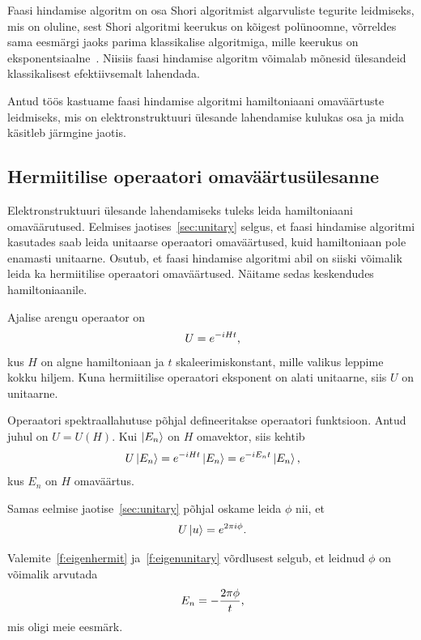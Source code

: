 \documentclass[12pt]{report}
\def\ket#1{\mathinner{|#1\rangle}}
\begin{document}
Faasi hindamise algoritm on osa Shori algoritmist algarvuliste tegurite leidmiseks, mis on oluline, sest Shori algoritmi keerukus on kõigest polünoomne, võrreldes sama eesmärgi jaoks parima klassikalise algoritmiga, mille keerukus on eksponentsiaalne~\cite{cao+etal, kaye+laflamme+mosca}.
Niisiis faasi hindamise algoritm võimalab mõnesid ülesandeid klassikalisest efektiivsemalt lahendada.

Antud töös kastuame faasi hindamise algoritmi hamiltoniaani omaväärtuste leidmiseks, mis on elektronstruktuuri ülesande lahendamise kulukas osa ja mida käsitleb järmgine jaotis.


\subsection{Hermiitilise operaatori omaväärtusülesanne}\label{sec:hermit}

Elektronstruktuuri ülesande lahendamiseks tuleks leida hamiltoniaani omaväärutused.
Eelmises jaotises~\ref{sec:unitary} selgus, et faasi hindamise algoritmi kasutades saab leida unitaarse operaatori omaväärtused, kuid hamiltoniaan pole enamasti unitaarne.
Osutub, et faasi hindamise algoritmi abil on siiski võimalik leida ka hermiitilise operaatori omaväärtused.
Näitame sedas keskendudes hamiltoniaanile.

Ajalise arengu operaator on
\begin{align}
    U = e^{-iHt} \rlap{,}
\end{align}
kus \(H\) on algne hamiltoniaan ja \(t\) skaleerimiskonstant, mille valikus leppime kokku hiljem.
Kuna hermiitilise operaatori eksponent on alati unitaarne, siis \(U\) on unitaarne.

Operaatori spektraallahutuse põhjal defineeritakse operaatori funktsioon.
Antud juhul on \(U=U(H)\).
Kui \(\ket{E_n}\) on \(H\) omavektor, siis kehtib
\begin{align}\label{f:eigenhermit}
    U \ket{E_n} = e^{-iHt}\ket{E_n} = e^{-i E_n t} \ket{E_n} \rlap{,}
\end{align}
kus \(E_n\) on \(H\) omaväärtus.

Samas eelmise jaotise~\ref{sec:unitary} põhjal oskame leida \(\phi\) nii, et
\begin{align}\label{f:eigenunitary}
    U \ket{u} = e^{2\pi i\phi} \rlap{.}
\end{align}

Valemite~\ref{f:eigenhermit} ja~\ref{f:eigenunitary} võrdlusest selgub, et leidnud \(\phi\) on võimalik arvutada
\begin{align}
    E_n = -\frac{2\pi\phi}{t} \rlap{,}
\end{align}
mis oligi meie eesmärk.
\end{document}

